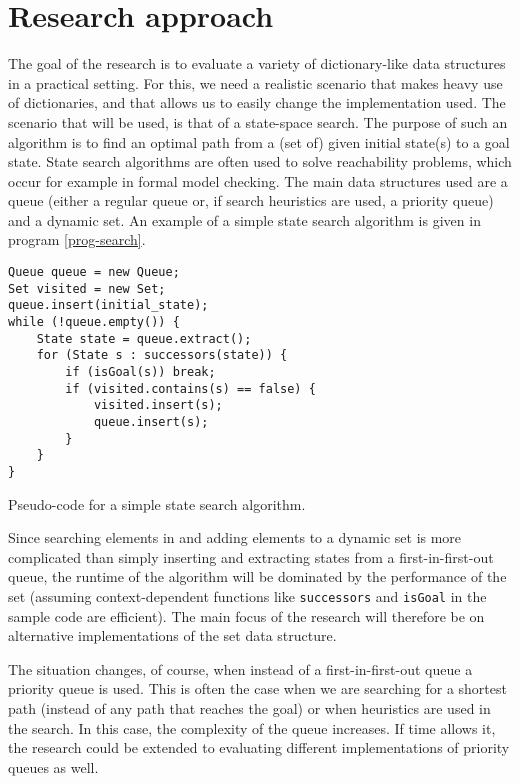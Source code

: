 \documentclass{acm_proc_article-sp}
\begin{document}
\section{Research approach}


The goal of the research is to evaluate a variety of dictionary-like data structures in a practical setting. For this, we need a realistic scenario that makes heavy use of dictionaries, and that allows us to easily change the implementation used. The scenario that will be used, is that of a state-space search. The purpose of such an algorithm is to find an optimal path from a (set of) given initial state(s) to a goal state. State search algorithms are often used to solve reachability problems, which occur for example in formal model checking. The main data structures used are a queue (either a regular queue or, if search heuristics are used, a priority queue) and a dynamic set. An example of a simple state search algorithm is given in program \ref{prog-search}.

\begin{program}
\begin{verbatim}
Queue queue = new Queue;
Set visited = new Set;
queue.insert(initial_state);
while (!queue.empty()) {
    State state = queue.extract();
    for (State s : successors(state)) {
        if (isGoal(s)) break;
        if (visited.contains(s) == false) {
            visited.insert(s);
            queue.insert(s);
        }
    }
}
\end{verbatim}
\caption{Pseudo-code for a simple state search algorithm.}
\label{prog-search}
\end{program}

Since searching elements in and adding elements to a dynamic set is more complicated than simply inserting and extracting states from a first-in-first-out queue, the runtime of the algorithm will be dominated by the performance of the set (assuming context-dependent functions like \verb#successors# and \verb#isGoal# in the sample code are efficient). The main focus of the research will therefore be on alternative implementations of the set data structure.

The situation changes, of course, when instead of a first-in-first-out queue a priority queue is used. This is often the case when we are searching for a shortest path (instead of any path that reaches the goal) or when heuristics are used in the search. In this case, the complexity of the queue increases. If time allows it, the research could be extended to evaluating different implementations of priority queues as well.
\end{document}
